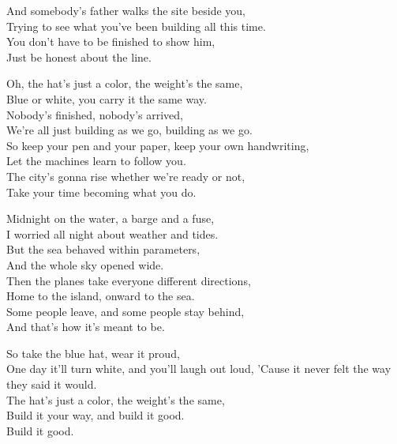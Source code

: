 \begin{lyrics}
And somebody’s father walks the site beside you,\\
Trying to see what you’ve been building all this time.\\
You don’t have to be finished to show him,\\
Just be honest about the line.

Oh, the hat’s just a color, the weight’s the same,\\
Blue or white, you carry it the same way.\\
Nobody’s finished, nobody’s arrived,\\
We’re all just building as we go, building as we go.\\
So keep your pen and your paper, keep your own handwriting,\\
Let the machines learn to follow you.\\
The city’s gonna rise whether we’re ready or not,\\
Take your time becoming what you do.

Midnight on the water, a barge and a fuse,\\
I worried all night about weather and tides.\\
But the sea behaved within parameters,\\
And the whole sky opened wide.\\
Then the planes take everyone different directions,\\
Home to the island, onward to the sea.\\
Some people leave, and some people stay behind,\\
And that’s how it’s meant to be.

So take the blue hat, wear it proud,\\
One day it’ll turn white, and you’ll laugh out loud,
’Cause it never felt the way they said it would.\\
The hat’s just a color, the weight’s the same,\\
Build it your way, and build it good.
\\
Build it good.
\end{lyrics}

